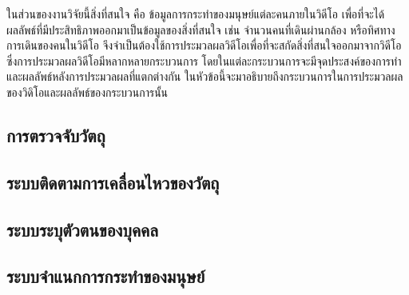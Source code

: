 ในส่วนของงานวิจัยนี้สิ่งที่สนใจ คือ ข้อมูลการกระทำของมนุษย์แต่ละคนภายในวิดีโอ เพื่อที่จะได้ผลลัพธ์ที่มีประสิทธิภาพออกมาเป็นข้อมูลของสิ่งที่สนใจ เช่น จำนวนคนที่เดินผ่านกล้อง 
หรือทิศทางการเดินของคนในวิดีโอ จึงจำเป็นต้องใช้การประมวลผลวิดีโอเพื่อที่จะสกัดสิ่งที่สนใจออกมาจากวิดีโอ ซึ่งการประมวลผลวิดีโอมีหลากหลายกระบวนการ 
โดยในแต่ละกระบวนการจะมีจุดประสงค์ของการทำและผลลัพธ์หลังการประมวลผลที่แตกต่างกัน ในหัวข้อนี้จะมาอธิบายถึงกระบวนการในการประมวลผลของวิดิโอและผลลัพธ์ของกระบวนการนั้น
\subsection{การตรวจจับวัตถุ}


\subsection{ระบบติดตามการเคลื่อนไหวของวัตถุ}


\subsection{ระบบระบุตัวตนของบุคคล}

\clearpage
\subsection{ระบบจำแนกการกระทำของมนุษย์}

